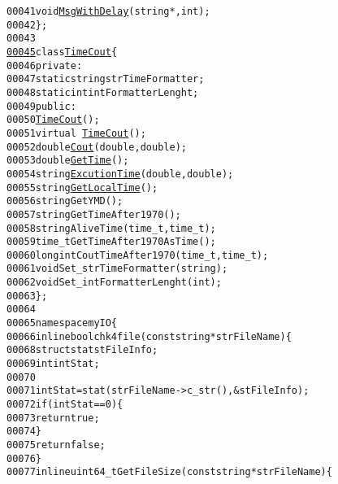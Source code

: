 \begin{footnotesize}
\begin{alltt}
00041         \textcolor{keywordtype}{void} \hyperlink{classdebugMsg_a4b45960ebecff6ad91cef6a915d5b3b6}{MsgWithDelay}(\textcolor{keywordtype}{string}*,\textcolor{keywordtype}{int});
00042 \};
00043 
\hypertarget{SupportClass_8hpp_source_l00045}{}\hyperlink{classTimeCout}{00045} \textcolor{keyword}{class }\hyperlink{classTimeCout}{TimeCout}\{
00046     \textcolor{keyword}{private}:
00047         \textcolor{keyword}{static} \textcolor{keywordtype}{string} strTimeFormatter;
00048         \textcolor{keyword}{static} \textcolor{keywordtype}{int} intFormatterLenght;
00049     \textcolor{keyword}{public}:
00050         \hyperlink{classTimeCout}{TimeCout}();
00051         \textcolor{keyword}{virtual} ~\hyperlink{classTimeCout}{TimeCout}();
00052         \textcolor{keywordtype}{double} \hyperlink{classTimeCout_ac8c0cffeea3afdc63d2d9cb86320c89f}{Cout}(\textcolor{keywordtype}{double},\textcolor{keywordtype}{double});
00053         \textcolor{keywordtype}{double} \hyperlink{classTimeCout_ad88edc4a3eccda520f2bdf7d69f852b9}{GetTime}();
00054         \textcolor{keywordtype}{string} \hyperlink{classTimeCout_a6ed7a20e4510642d6ffdf1cdbffd2b9f}{ExcutionTime}(\textcolor{keywordtype}{double},\textcolor{keywordtype}{double});
00055         \textcolor{keywordtype}{string} \hyperlink{classTimeCout_a343b4ea828779afff35c01bbfc4fa506}{GetLocalTime}();
00056         \textcolor{keywordtype}{string} GetYMD();
00057         \textcolor{keywordtype}{string} GetTimeAfter1970();
00058         \textcolor{keywordtype}{string} AliveTime(time\_t,time\_t);
00059         time\_t GetTimeAfter1970AsTime();
00060         \textcolor{keywordtype}{long} \textcolor{keywordtype}{int} CoutTimeAfter1970(time\_t,time\_t);
00061         \textcolor{keywordtype}{void} Set\_strTimeFormatter(\textcolor{keywordtype}{string});
00062         \textcolor{keywordtype}{void} Set\_intFormatterLenght(\textcolor{keywordtype}{int});
00063 \};
00064 
00065 \textcolor{keyword}{namespace }myIO\{
00066     \textcolor{keyword}{inline} \textcolor{keywordtype}{bool} chk4file(\textcolor{keyword}{const} \textcolor{keywordtype}{string} *strFileName)\{
00068     \textcolor{keyword}{struct }stat stFileInfo;
00069     \textcolor{keywordtype}{int} intStat;
00070 
00071     intStat = stat(strFileName->c\_str(),&stFileInfo);
00072     \textcolor{keywordflow}{if}(intStat == 0) \{
00073         \textcolor{keywordflow}{return} \textcolor{keyword}{true};
00074     \}
00075     \textcolor{keywordflow}{return} \textcolor{keyword}{false};
00076     \}
00077     \textcolor{keyword}{inline} uint64\_t GetFileSize(\textcolor{keyword}{const} \textcolor{keywordtype}{string}*strFileName)\{

\end{alltt}
\end{footnotesize}
